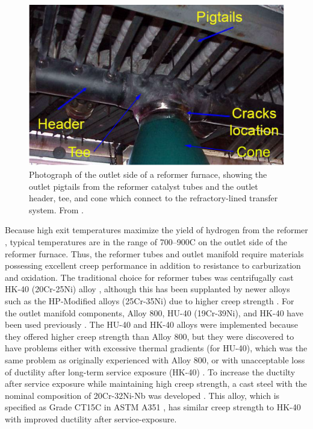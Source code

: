 \begin{figure}[h]
\centering
\includegraphics{figures/reformer-tee-cone}
\caption{Photograph of the outlet side of a reformer furnace, showing the outlet pigtails from the reformer catalyst tubes and the outlet header, tee, and cone which connect to the refractory-lined transfer system.  From \citet{penso_repair_2006}.}
\label{fig:reformer-tee-cone}
\end{figure}

Because high exit temperatures maximize the yield of hydrogen from the reformer \cite{haussinger_hydrogen_2000}, typical temperatures are in the range of 700--900C on the outlet side of the reformer furnace. Thus, the reformer tubes and outlet manifold require materials possessing excellent creep performance in addition to resistance to carburization and oxidation. The traditional choice for reformer tubes was centrifugally cast HK-40 (20Cr-25Ni) alloy \cite{rostrup-nielsen_catalytic_1984}, although this has been supplanted by newer alloys such as the HP-Modified alloys (25Cr-35Ni) due to higher creep strength \cite{schillmoller_hp-modified_1992}. For the outlet manifold components, Alloy 800, HU-40 (19Cr-39Ni), and HK-40 have been used previously \cite{shibasaki_experience_1993}. The HU-40 and HK-40 alloys were implemented because they offered higher creep strength than Alloy 800, but they were discovered to have problems either with excessive thermal gradients (for HU-40), which was the same problem as originally experienced with Alloy 800, or with unacceptable loss of ductility after long-term service exposure (HK-40) \cite{shibasaki_experience_1993,collins_effect_1980}. To increase the ductilty after service exposure while maintaining high creep strength, a cast steel with the nominal composition of 20Cr-32Ni-Nb was developed \cite{collins_effect_1980}. This alloy, which is specified as Grade CT15C in ASTM A351 \cite{astm_a351_2010}, has similar creep strength to HK-40 \cite{shibasaki_experience_1993} with improved ductility after service-exposure. 

